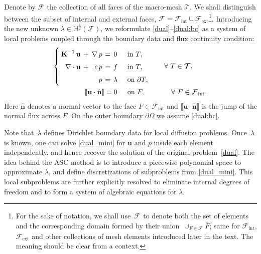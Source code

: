 \documentclass[12pt]{article}
\newcommand{\vect}[1]{\boldsymbol{\mathbf{#1}}}
\newcommand{\bcell}{T}
\newcommand{\bmesh}{{\vect{\mathcal T}}}
\newcommand{\bface}{F}
\newcommand{\bfaces}[1][]{{\vect{\mathcal F}_{\text{#1}}}}
\newcommand{\HHalfSpace}[1][\bface]{{\mathbb H^{\frac{1}{2}}\left({#1}\right)}}
\begin{document}
	Denote by $\bfaces$ the collection of all faces of the macro-mesh $\bmesh$. {\color{blue}We shall distinguish between the subset of internal and external faces},  $\bfaces = \bfaces[int] \cup \bfaces[ext]$\footnote{For the sake of  notation, we shall use~$\bfaces$ to denote both the set of elements and the corresponding domain formed by their union~$\cup_{F\in \bfaces} \bar{F}$; same for $\bfaces[int]$, $\bfaces[ext]$ and other collections of mesh elements introduced later in the text. The meaning should be clear from a context.}.
	Introducing the new unknown $\lambda \in \HHalfSpace[\bfaces]$, we reformulate \eqref{dual}--\eqref{dual:bc} as a system of local problems coupled through the boundary data
	and flux continuity condition:
	\begin{eqnarray}
		\arraycolsep=2pt\def\arraystretch{1.5}
		\left\{\begin{array}{rcrccl}
			\vect K^{-1}\,\vect u                    & + & \nabla\,p & = & 0       &\quad\text{in } \bcell, \\
			\nabla\cdot\vect u                       & + & c\,p      & = & f       &\quad\text{in } \bcell, \\
			                                         &   & p         & = & \lambda &\quad\text{on } \partial\bcell, %
		\end{array}\right.
		& \qquad \forall~\bcell\in\bmesh, \label{dual_mini} \\
		\llbracket\vect u \cdot \hat{\vect n}\rrbracket = 0\quad\:\:\text{on } F,\:\:\:\:
		& \qquad\quad \forall~F\in\bfaces[int]. \label{flux_cond}
	\end{eqnarray}
	Here $\hat{\vect n}$ denotes a normal vector to the face $F\in\bfaces[int]$ and $\llbracket \vect u\cdot\hat{\vect n} \rrbracket$ is the jump of the normal flux across $F$. On the outer boundary $\partial\Omega$ we assume \eqref{dual:bc}.
	
	Note that~$\lambda$ defines Dirichlet boundary data for local diffusion problems. Once~$\lambda$ is known, one can solve \eqref{dual_mini} for $\vect u$ and $p$ inside each element independently, and hence recover the solution of the original problem~\eqref{dual}. The idea behind the ASC method is to introduce a piecewise polynomial space to approximate $\lambda$, and  define discretizations of subproblems from \eqref{dual_mini}. This local subproblems are further explicitly resolved to eliminate internal degrees of freedom and to form a system of algebraic equations for $\lambda$.
	
\end{document}
